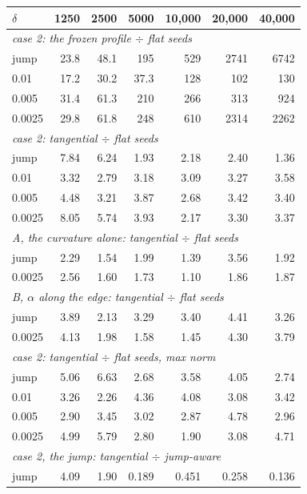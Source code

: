 \begin{tabular}{@{}lrrrrrr@{}}
\toprule
$\delta$ & 1250 & 2500 & 5000 & 10{,}000 & 20{,}000 & 40{,}000 \\
\midrule
\multicolumn{7}{l}{\emph{case 2: the frozen profile $\div$ flat seeds}} \\
jump & 23.8 & 48.1 & 195 & 529 & 2741 & 6742 \\
0.01 & 17.2 & 30.2 & 37.3 & 128 & 102 & 130 \\
0.005 & 31.4 & 61.3 & 210 & 266 & 313 & 924 \\
0.0025 & 29.8 & 61.8 & 248 & 610 & 2314 & 2262 \\
\midrule
\multicolumn{7}{l}{\emph{case 2: tangential $\div$ flat seeds}} \\
jump & 7.84 & 6.24 & 1.93 & 2.18 & 2.40 & 1.36 \\
0.01 & 3.32 & 2.79 & 3.18 & 3.09 & 3.27 & 3.58 \\
0.005 & 4.48 & 3.21 & 3.87 & 2.68 & 3.42 & 3.40 \\
0.0025 & 8.05 & 5.74 & 3.93 & 2.17 & 3.30 & 3.37 \\
\midrule
\multicolumn{7}{l}{\emph{A, the curvature alone: tangential $\div$ flat seeds}} \\
jump & 2.29 & 1.54 & 1.99 & 1.39 & 3.56 & 1.92 \\
0.0025 & 2.56 & 1.60 & 1.73 & 1.10 & 1.86 & 1.87 \\
\midrule
\multicolumn{7}{l}{\emph{B, $\alpha$ along the edge: tangential $\div$ flat seeds}} \\
jump & 3.89 & 2.13 & 3.29 & 3.40 & 4.41 & 3.26 \\
0.0025 & 4.13 & 1.98 & 1.58 & 1.45 & 4.30 & 3.79 \\
\midrule
\multicolumn{7}{l}{\emph{case 2: tangential $\div$ flat seeds, max norm}} \\
jump & 5.06 & 6.63 & 2.68 & 3.58 & 4.05 & 2.74 \\
0.01 & 3.26 & 2.26 & 4.36 & 4.08 & 3.08 & 3.42 \\
0.005 & 2.90 & 3.45 & 3.02 & 2.87 & 4.78 & 2.96 \\
0.0025 & 4.99 & 5.79 & 2.80 & 1.90 & 3.08 & 4.71 \\
\midrule
\multicolumn{7}{l}{\emph{case 2, the jump: tangential $\div$ jump-aware}} \\
jump & 4.09 & 1.90 & 0.189 & 0.451 & 0.258 & 0.136 \\
\bottomrule
\end{tabular}
